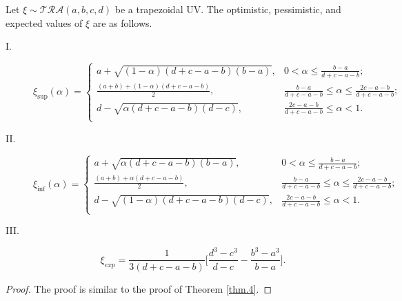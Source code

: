 \begin{theorem}\label{thm.5}
	Let $\xi\sim \mathcal{TRA}(a,b,c,d)$ be a trapezoidal UV. The optimistic, pessimistic, and expected values of $\xi$ are as follows.
	\begin{description}
		\item[ I.]  
		\[\xi_{\sup}(\alpha)=\left\{
		\begin{array}{ll}
			a+\sqrt{(1-\alpha)(d+c-a-b)(b-a)}, & 0<\alpha\leq \frac{b-a}{d+c-a-b};\\
			\frac{(a+b)+(1-\alpha)(d+c-a-b)}{2}, &  \frac{b-a}{d+c-a-b}\leq\alpha\leq \frac{2c-a-b}{d+c-a-b} ;\\
			d-\sqrt{\alpha(d+c-a-b)(d-c)}, &  \frac{2c-a-b}{d+c-a-b}\leq\alpha<1.\\
		\end{array}
		\right.
		\]
		\item[ II.]  \[\xi_{\inf}(\alpha)=\left\{
		\begin{array}{ll}
			a+\sqrt{\alpha(d+c-a-b)(b-a)}, & 0<\alpha\leq \frac{b-a}{d+c-a-b};\\
			\frac{(a+b)+\alpha(d+c-a-b)}{2}, &  \frac{b-a}{d+c-a-b}\leq\alpha\leq \frac{2c-a-b}{d+c-a-b} ;\\
			d-\sqrt{(1-\alpha)(d+c-a-b)(d-c)}, &  \frac{2c-a-b}{d+c-a-b}\leq\alpha<1.\\
		\end{array}
		\right.
		\]
		\item[ III.]  $$\xi_{exp}=\frac{1}{3(d+c-a-b)}\bigg[\frac{d^3-c^3}{d-c}-\frac{b^3-a^3}{b-a}\bigg].$$
	\end{description} 
\end{theorem}
\begin{proof}
	The proof is similar to the proof of Theorem \ref{thm.4}.
\end{proof}
